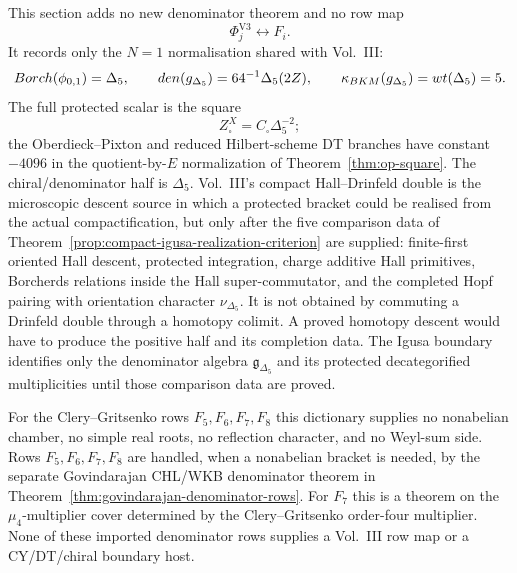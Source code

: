 This section adds no new denominator theorem and no row map
$$\Phi^{\mathrm{V3}}_j\longleftrightarrow F_i.$$
It records only the $N=1$ normalisation shared with Vol.~III:
$$
Borch(\phi_{0,1})=\Delta_5,\qquad
den(g_{\Delta_5})=64^{-1}\Delta_5(2Z),\qquad
\kappa_{BKM}(g_{\Delta_5})=wt(\Delta_5)=5.
$$
The full protected scalar is the square
$$
Z^X_{\square}=C_{\square}\Delta_5^{-2};
$$
the Oberdieck--Pixton and reduced Hilbert-scheme DT branches have
constant \(-4096\) in the quotient-by-\(E\) normalization of
Theorem~\ref{thm:op-square}.  The chiral/denominator half is
\(\Delta_5\).
Vol.~III's compact Hall--Drinfeld double is the microscopic descent
source in which a protected bracket could be realised from the actual
compactification, but only after the five comparison data of
Theorem~\ref{prop:compact-igusa-realization-criterion} are supplied:
finite-first oriented Hall descent, protected integration, charge
additive Hall primitives, Borcherds relations inside the Hall
super-commutator, and the completed Hopf pairing with orientation
character \(\nu_{\Delta_5}\).  It is not obtained by commuting a
Drinfeld double through a homotopy colimit.  A proved homotopy descent
would have to produce the positive half and its completion data.  The
Igusa boundary identifies only the denominator algebra
\(\mathfrak g_{\Delta_5}\) and its protected decategorified
multiplicities until those comparison data are proved.

For the Clery--Gritsenko rows $F_5,F_6,F_7,F_8$ this dictionary supplies
no nonabelian chamber, no simple real roots, no reflection character,
and no Weyl-sum side.  Rows $F_5,F_6,F_7,F_8$ are handled, when a
nonabelian bracket is needed, by the separate Govindarajan CHL/WKB
denominator theorem in Theorem~\ref{thm:govindarajan-denominator-rows}.
For $F_7$ this is a theorem on the $\mu_4$-multiplier cover determined
by the Clery--Gritsenko order-four multiplier.  None of these imported
denominator rows supplies a Vol.~III row map or a CY/DT/chiral boundary
host.
